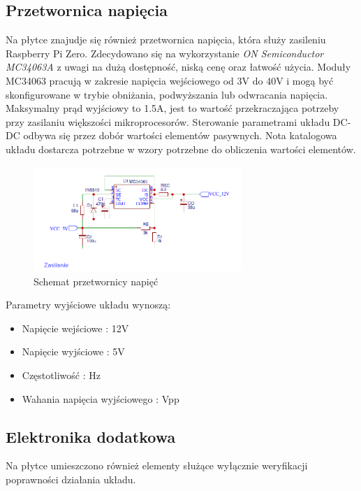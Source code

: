 \documentclass[12pt, eng, twoside, openany, final]{mgr}
\begin{document}
        \subsection{Przetwornica napięcia}
        Na płytce znajudje się również przetwornica napięcia, która służy zasileniu Raspberry Pi Zero. Zdecydowano się na wykorzystanie \emph{ON Semiconductor MC34063A} z uwagi na dużą dostępność, niską cenę oraz łatwość użycia. Moduły MC34063 pracują w zakresie napięcia wejściowego od 3V do 40V i mogą być skonfigurowane w trybie obniżania, podwyższania lub odwracania napięcia. Maksymalny prąd wyjściowy to 1.5A, jest to wartość przekraczająca potrzeby przy zasilaniu większości mikroprocesorów. Sterowanie parametrami układu DC-DC odbywa się przez dobór wartości elementów pasywnych. Nota katalogowa układu dostarcza potrzebne w wzory potrzebne do obliczenia wartości elementów.
                \begin{figure}[H]
                \begin{center}
                    \includegraphics[width=0.7\textwidth]{psu.png}
                    \caption{Schemat przetwornicy napięć}
                \end{center}
                \end{figure}
        Parametry wyjściowe układu wynoszą:
        \begin{itemize}
            \item Napięcie wejściowe : 12V
            \item Napięcie wyjściowe : 5V
            \item Częstotliwość      : Hz 
            \item Wahania napięcia wyjściowego : Vpp 
        \end{itemize}
                
        \subsection{Elektronika dodatkowa}
        Na płytce umieszczono również elementy służące wyłącznie weryfikacji poprawności działania układu.
        
\end{document}
